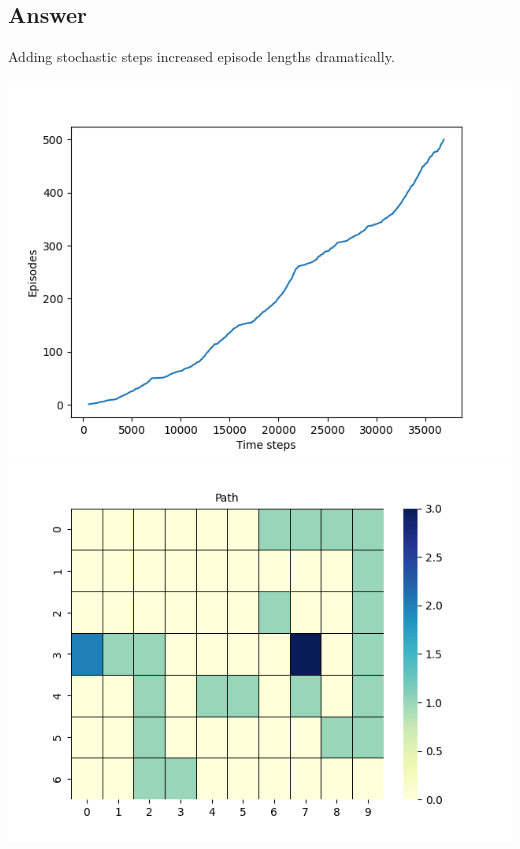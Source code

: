 \documentclass[11pt]{article}
\begin{document}
    \subsection*{Answer}

    Adding stochastic steps increased episode lengths dramatically.

    \includegraphics[scale=0.4]{figure_6_3_ex_6_10}
    \includegraphics[scale=0.4]{figure_6_3_ex_6_10_grid}
\end{document}
